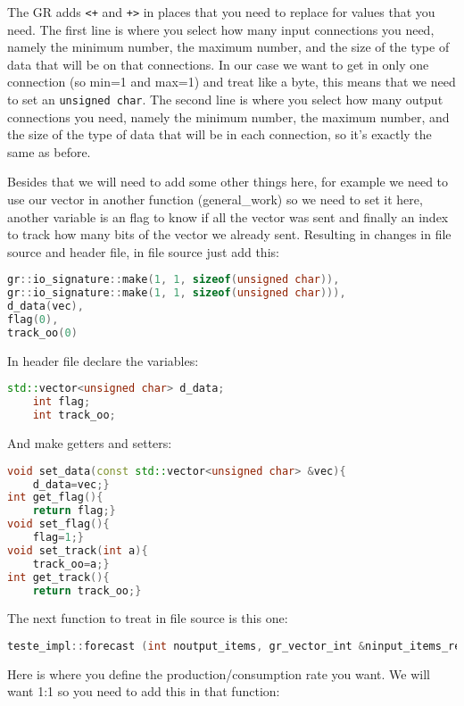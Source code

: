\documentclass[a4paper, 10pt, conference]{ieeeconf}      %
\begin{document}
    The GR adds \verb|<+| and \verb|+>| in places that you need to replace for values that you need. The first line is where you select how many input connections you need, namely the minimum number, the maximum number, and the size of the type of data that will be on that connections. In our case we want to get in only one connection (so min=1 and max=1) and treat like a byte, this means that we need to set an \verb|unsigned char|.
    The second line is where you select how many output connections you need, namely the minimum number, the maximum number, and the size of the type of data that will be in each connection, so it's exactly the same as before.
    
    Besides that we will need to add some other things here, for example we need to use our vector in another function (general\_work) so we need to set it here, another variable is an flag to know if all the vector was sent and finally an index to track how many bits of the vector we already sent.
    Resulting in changes in file source and header file, in file source just add this:
\begin{lstlisting}[language=c++, breaklines]   
gr::io_signature::make(1, 1, sizeof(unsigned char)),
gr::io_signature::make(1, 1, sizeof(unsigned char))),
d_data(vec),
flag(0),
track_oo(0)
\end{lstlisting}  

    In header file declare the variables:
\begin{lstlisting}[language=c++, breaklines] 
    std::vector<unsigned char> d_data;
    int flag;
    int track_oo;
\end{lstlisting} 
    And make getters and setters:
    
 \begin{lstlisting}[language=c++, breaklines]   
void set_data(const std::vector<unsigned char> &vec){
    d_data=vec;}
int get_flag(){
    return flag;}
void set_flag(){
    flag=1;}
void set_track(int a){
    track_oo=a;}
int get_track(){
    return track_oo;}
\end{lstlisting}    

    The next function to treat in file source is this one:
\begin{lstlisting}[language=c++, breaklines]   
teste_impl::forecast (int noutput_items, gr_vector_int &ninput_items_required){}
\end{lstlisting}
    
    Here is where you define the production/consumption rate you want. We will want 1:1 so you need to add this in that function:
    
\end{document}

